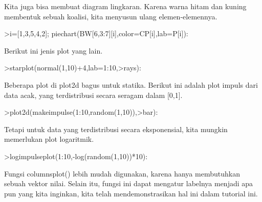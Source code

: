 \documentclass[a4paper,10pt]{article}
\begin{document}
\begin{eulernotebook}
\begin{eulercomment}
\begin{eulercomment}
\begin{eulercomment}
\begin{eulercomment}
\begin{eulercomment}
\begin{eulercomment}
\begin{eulercomment}
\begin{eulercomment}
\begin{eulercomment}
\begin{eulercomment}
\begin{eulercomment}
\begin{eulercomment}
\begin{eulercomment}
\begin{eulercomment}
\begin{eulercomment}
\begin{eulercomment}
\begin{eulercomment}
\begin{eulercomment}
\begin{eulercomment}
Kita juga bisa membuat diagram lingkaran. Karena warna hitam dan
kuning membentuk sebuah koalisi, kita menyusun ulang elemen-elemennya.
\end{eulercomment}
\begin{eulerprompt}
>i=[1,3,5,4,2]; piechart(BW[6,3:7][i],color=CP[i],lab=P[i]):
\end{eulerprompt}
\begin{eulercomment}
Berikut ini jenis plot yang lain.
\end{eulercomment}
\begin{eulerprompt}
>starplot(normal(1,10)+4,lab=1:10,>rays):
\end{eulerprompt}
\begin{eulercomment}
Beberapa plot di plot2d bagus untuk statika. Berikut ini adalah plot
impuls dari data acak, yang terdistribusi secara seragam dalam [0,1].
\end{eulercomment}
\begin{eulerprompt}
>plot2d(makeimpulse(1:10,random(1,10)),>bar):
\end{eulerprompt}
\begin{eulercomment}
Tetapi untuk data yang terdistribusi secara eksponensial, kita mungkin
memerlukan plot logaritmik.
\end{eulercomment}
\begin{eulerprompt}
>logimpulseplot(1:10,-log(random(1,10))*10):
\end{eulerprompt}
\begin{eulercomment}
Fungsi columnsplot() lebih mudah digunakan, karena hanya membutuhkan
sebuah vektor nilai. Selain itu, fungsi ini dapat mengatur labelnya
menjadi apa pun yang kita inginkan, kita telah mendemonstrasikan hal
ini dalam tutorial ini.


\end{eulercomment}
\end{eulercomment}
\end{eulercomment}
\end{eulercomment}
\end{eulercomment}
\end{eulercomment}
\end{eulercomment}
\end{eulercomment}
\end{eulercomment}
\end{eulercomment}
\end{eulercomment}
\end{eulercomment}
\end{eulercomment}
\end{eulercomment}
\end{eulercomment}
\end{eulercomment}
\end{eulercomment}
\end{eulercomment}
\end{eulercomment}
\end{eulernotebook}
\end{document}
